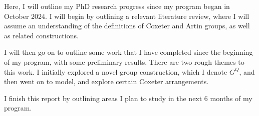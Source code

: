 Here, I will outline my PhD research progress since my program began in October 2024.
I will begin by outlining a relevant literature review, where I will assume an understanding of the definitions of Coxeter and Artin groups, as well as related constructions.

I will then go on to outline some work that I have completed since the beginning of my program, with some preliminary results.
There are two rough themes to this work.
I initially explored a novel group construction, which I denote $G^Q$, and then went on to model, and explore certain Coxeter arrangements.

I finish this report by outlining areas I plan to study in the next 6 months of my program.
